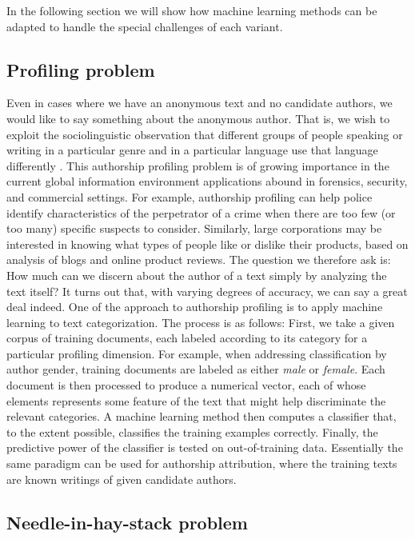In the following section we will show how machine learning methods can be adapted to handle the special challenges of each variant.

\subsection{Profiling problem}
Even in cases where we have an anonymous text and no candidate authors, we would like to say something about the anonymous author. That is, we wish to exploit the sociolinguistic observation that different groups of people speaking or writing in a particular genre and in a particular language use that language differently \cite{chambers2004handbook}.
This authorship profiling problem is of growing importance in the current global information environment applications abound in forensics, security, and commercial settings. For example, authorship profiling can help police identify characteristics of the perpetrator of a crime when there are too few (or too many) specific suspects to consider. Similarly, large corporations may be interested in knowing what types of people like or dislike their products, based on analysis of blogs and online product reviews. The question we therefore ask is: How much can we discern about the author of a text simply by analyzing the text itself? It turns out that, with varying degrees of accuracy, we can say a great deal indeed.
One of the approach to authorship profiling is to apply machine learning to text categorization. The process is as follows: First, we take a given corpus of training documents, each labeled according to its category for a particular profiling dimension. For example, when addressing classification by author gender, training documents are labeled as either \textit{male} or \textit{female}. Each document is then processed to produce a numerical vector, each of whose elements represents some feature of the text that might help discriminate the relevant categories. A machine learning method then computes a classifier that, to the extent possible, classifies the training examples correctly. Finally, the predictive power of the classifier is tested on out-of-training data.
Essentially the same paradigm can be used for authorship attribution, where the training texts are known writings of given candidate authors.\cite{juola2008authorship}

\subsection{Needle-in-hay-stack problem}

